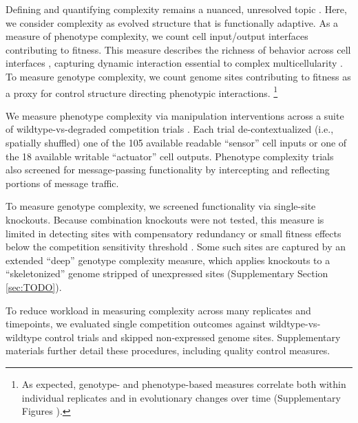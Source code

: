 Defining and quantifying complexity remains a nuanced, unresolved topic \citep{adami2002what,parrott2010measuring,bottcher2017molecules,tenaillon2007quantifying,bonchev2005complexity,hazen2007functional,marion2015extending,rebout2021measuring,McShea1996}.
Here, we consider complexity as evolved structure that is functionally adaptive.
As a measure of phenotype complexity, we count cell input/output interfaces contributing to fitness.
This measure describes the richness of behavior across cell interfaces \citep{mcshea2000functional}, capturing dynamic interaction essential to complex multicellularity \citep{knoll2011multiple,niklas2013origins,brunet2017origin,bonner2001first}.
To measure genotype complexity, we count genome sites contributing to fitness \citep{dolson2019modes,adami2000evolution} as a proxy for control structure directing phenotypic interactions.
\unskip\footnote{%
As expected, genotype- and phenotype-based measures correlate both within individual replicates and in evolutionary changes over time (Supplementary Figures ).
}

We measure phenotype complexity via manipulation interventions across a suite of wildtype-vs-degraded competition trials \citep{sinervo1996testing}.
Each trial de-contextualized (i.e., spatially shuffled) one of the 105 available readable ``sensor'' cell inputs or one of the 18 available writable ``actuator'' cell outputs.
Phenotype complexity trials also screened for message-passing functionality by intercepting and reflecting portions of message traffic.

To measure genotype complexity, we screened functionality via single-site knockouts.
Because combination knockouts were not tested, this measure is limited in detecting sites with compensatory redundancy or small fitness effects below the competition sensitivity threshold \citep{moreno2024methods}.
Some such sites are captured by an extended ``deep'' genotype complexity measure, which applies knockouts to a ``skeletonized'' genome stripped of unexpressed sites (Supplementary Section \ref{sec:TODO}).

To reduce workload in measuring complexity across many replicates and timepoints, we evaluated single competition outcomes against wildtype-vs-wildtype control trials and skipped non-expressed genome sites.
Supplementary materials further detail these procedures, including quality control measures.


